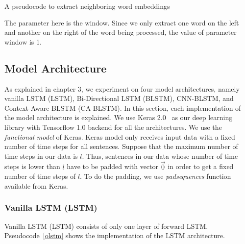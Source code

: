\begin{kode}	
	
	\SetAlgoLined
	\caption{A pseudocode to extract neighboring word embeddings}
	\label{code:neighboringwe}	
\end{kode}

The parameter here is the window. Since we only extract one word on the left and another on the right of the word being processed, the value of parameter window is 1.

\subsection{Model Architecture}
As explained in chapter 3, we experiment on four model architectures, namely vanilla LSTM (LSTM), Bi-Directional LSTM (BLSTM), CNN-BLSTM, and Context-Aware BLSTM (CA-BLSTM). In this section, each implementation of the model architecture is explained. We use Keras 2.0~\citep{chollet2015} as our deep learning library with Tensorflow 1.0 backend for all the architectures. We use the \textit{functional model} of Keras. Keras model only receives input data with a fixed number of time steps for all sentences. Suppose that the maximum number of time steps in our data is $l$. Thus, sentences in our data whose number of time steps is lower than $l$ have to be padded with vector $ \vec{0}$ in order to get a fixed number of time steps of $l$. To do the padding, we use \textit{padsequences} function available from Keras.

\subsubsection{Vanilla LSTM (LSTM)}
Vanilla LSTM (LSTM) consists of only one layer of forward LSTM. Pseudocode~\ref{olstm} shows the implementation of the LSTM architecture.

